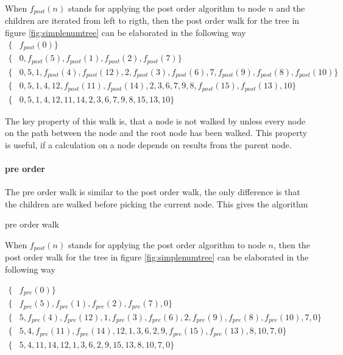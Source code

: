When $f_{post} (n)$ stands for applying the post order algorithm to node $n$ and the children are iterated from left to rigth, then the post order walk for the tree in figure \ref{fig:simplenumtree} can be elaborated in the following way
\begin{align}
\big\{& f_{post} (0) \big\} \nonumber \\
\big\{& 0, f_{post} (5),  f_{post} (1),  f_{post} (2),  f_{post} (7) \big\} \nonumber \\
\big\{& 0, 5, 1, f_{post} (4), f_{post} (12), 2, f_{post} (3), f_{post} (6), 7, f_{post} (9), f_{post} (8), f_{post} (10)\big\} \nonumber \\
\big\{& 0, 5, 1, 4, 12, f_{post} (11), f_{post} (14), 2, 3, 6, 7, 9, 8, f_{post} (15), f_{post} (13), 10 \big\} \nonumber \\
\big\{& 0, 5, 1, 4, 12, 11, 14, 2, 3, 6, 7, 9, 8, 15, 13, 10 \big\} \nonumber 
\end{align}

The key property of this walk is, that a node is not walked by unless every node on the path between the node and the root node has been walked. This property is useful, if a calculation on a node depends on results from the parent node.

\paragraph{pre order}
The pre order walk is similar to the post order walk, the only difference is that the children are walked before picking the current node. This gives the algorithm

\begin{algorithm}
\caption{pre order walk}
\begin{algorithmic}
\label{alg:preorder}
\ENDFOR
{}
\end{algorithmic}
\end{algorithm}

When $f_{post} (n)$ stands for applying the post order algorithm to node $n$, then the post order walk for the tree in figure \ref{fig:simplenumtree} can be elaborated in the following way

\begin{align}
\big\{& f_{pre} (0) \big\} \nonumber \\
\big\{& f_{pre} (5),  f_{pre} (1),  f_{pre} (2),  f_{pre} (7), 0\big\} \nonumber \\
\big\{& 5, f_{pre} (4), f_{pre} (12), 1,  f_{pre} (3),  f_{pre} (6), 2,  f_{pre} (9),  f_{pre} (8), f_{pre} (10), 7, 0\big\} \nonumber \\
\big\{& 5, 4,  f_{pre} (11),  f_{pre} (14), 12, 1, 3, 6, 2, 9,  f_{pre} (15),  f_{pre} (13), 8, 10, 7, 0\big\} \nonumber \\
\big\{& 5, 4, 11, 14, 12, 1, 3, 6, 2, 9, 15, 13, 8, 10, 7, 0\big\} \nonumber
\end{align}

